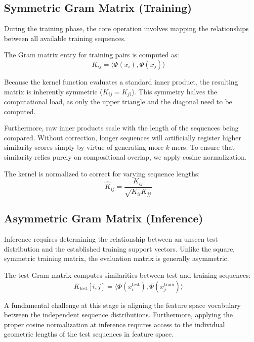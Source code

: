 \subsection{Symmetric Gram Matrix (Training)}\label{sec:gram-symmetric}

During the training phase, the core operation involves mapping the relationships between all available training sequences. 

The Gram matrix entry for training pairs is computed as:
\begin{equation}\label{eq:gram-entry}
K_{ij} = \langle \Phi(x_i), \Phi(x_j) \rangle
\end{equation}

Because the kernel function evaluates a standard inner product, the resulting matrix is inherently symmetric ($K_{ij} = K_{ji}$). This symmetry halves the computational load, as only the upper triangle and the diagonal need to be computed. 

Furthermore, raw inner products scale with the length of the sequences being compared. Without correction, longer sequences will artificially register higher similarity scores simply by virtue of generating more $k$-mers. To ensure that similarity relies purely on compositional overlap, we apply cosine normalization.

The kernel is normalized to correct for varying sequence lengths:
\begin{equation}\label{eq:gram-normalize}
\hat{K}_{ij} = \frac{K_{ij}}{\sqrt{K_{ii} K_{jj}}}
\end{equation}

\subsection{Asymmetric Gram Matrix (Inference)}\label{sec:gram-asymmetric}

Inference requires determining the relationship between an unseen test distribution and the established training support vectors. Unlike the square, symmetric training matrix, the evaluation matrix is generally asymmetric.

The test Gram matrix computes similarities between test and training sequences:
\begin{equation}\label{eq:gram-test}
K_{\text{test}}[i, j] = \langle \Phi(x_i^{\text{test}}), \Phi(x_j^{\text{train}}) \rangle
\end{equation}

A fundamental challenge at this stage is aligning the feature space vocabulary between the independent sequence distributions. Furthermore, applying the proper cosine normalization at inference requires access to the individual geometric lengths of the test sequences in feature space.

